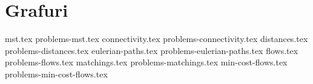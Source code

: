 \part{Grafuri}

{mst.tex}
{problems-mst.tex}
{connectivity.tex}
{problems-connectivity.tex}
{distances.tex}
{problems-distances.tex}
{eulerian-paths.tex}
{problems-eulerian-paths.tex}
{flows.tex}
{problems-flows.tex}
{matchings.tex}
{problems-matchings.tex}
{min-cost-flows.tex}
{problems-min-cost-flows.tex}
